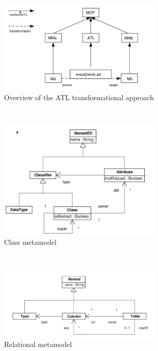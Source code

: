 \documentclass{llncs}
\begin{document}
\begin{figure}
	\centering
	\includegraphics[width=0.7\textwidth,natwidth=610,natheight=642]{figures/Overview_ATL.jpg}
	\caption{Overview of the ATL transformational approach}
	\label{fig:overview_atl}
\end{figure}~\cite{atl:frederic}

\begin{figure}
	\centering
	\includegraphics[width=0.7\textwidth,natwidth=610,natheight=642]{figures/Class_metamodel.jpg}
	\caption{Class metamodel}
	\label{fig:class_metamodel_atl}
\end{figure}~\cite{atl:frederic}

\begin{figure}
	\centering
	\includegraphics[width=0.7\textwidth,natwidth=610,natheight=642]{figures/Relational_metamodel.jpg}
	\caption{Relational metamodel}
	\label{fig:relational_metamodel_atl}
\end{figure}~\cite{atl:frederic}
\end{document}
